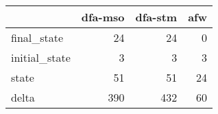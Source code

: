 \begin{tabular}{lrrr}
\toprule
{} &  dfa-mso &  dfa-stm &  afw \\
\midrule
final\_state   &       24 &       24 &    0 \\
initial\_state &        3 &        3 &    3 \\
state         &       51 &       51 &   24 \\
delta         &      390 &      432 &   60 \\
\bottomrule
\end{tabular}
